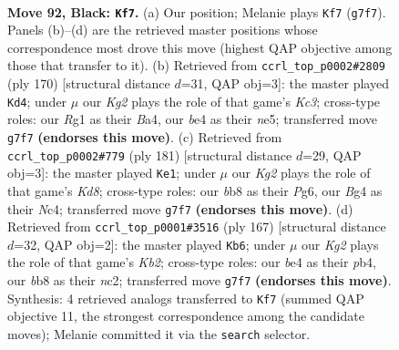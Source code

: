\documentclass[11pt]{article}
\begin{document}
\clearpage

\begin{figure}[p]\centering
\begin{subfigure}{0.46\textwidth}\centering
\resizebox{\linewidth}{!}{%
\newchessgame
\chessboard[
  setfen={1B6/6k1/1PR5/3N4/P3B1b1/1K5p/8/6r1 b - - 6 92},
  showmover=false,
  pgfstyle=straightmove, color=movearrow, markmove={g7-f7}
]}
\caption{}
\end{subfigure}\hfill
\begin{subfigure}{0.46\textwidth}\centering
\resizebox{\linewidth}{!}{%
\newchessgame
\chessboard[
  setfen={2R5/4k3/4p1b1/2P1n1p1/B7/2K5/8/8 w - - 7 86},
  showmover=false,
  pgfstyle=straightmove, color=movearrow, markmove={c3-d4}
]}
\caption{}
\end{subfigure}
\\[4pt]
\begin{subfigure}{0.46\textwidth}\centering
\resizebox{\linewidth}{!}{%
\newchessgame
\chessboard[
  setfen={8/3r3p/6p1/8/2n2B2/7P/R5PK/3k4 b - - 55 91},
  showmover=false,
  pgfstyle=straightmove, color=movearrow, markmove={d1-e1}
]}
\caption{}
\end{subfigure}\hfill
\begin{subfigure}{0.46\textwidth}\centering
\resizebox{\linewidth}{!}{%
\newchessgame
\chessboard[
  setfen={8/1k6/8/1p4r1/1P6/2P4R/1KN5/6b1 b - - 78 84},
  showmover=false,
  pgfstyle=straightmove, color=movearrow, markmove={b7-b6}
]}
\caption{}
\end{subfigure}
\caption{\textbf{Move 92, Black: \texttt{Kf7}.} (a) Our position; Melanie plays \texttt{Kf7} (\texttt{g7f7}). Panels (b)--(d) are the retrieved master positions whose correspondence most drove this move (highest QAP objective among those that transfer to it). (b) Retrieved from \texttt{ccrl\_top\_p0002\#2809} (ply 170) [structural distance $d$=31, QAP obj=3]: the master played \texttt{Kd4}; under $\mu$ our \emph{Kg2} plays the role of that game's \emph{Kc3}; cross-type roles: our \emph{R}g1 as their \emph{B}a4, our \emph{b}e4 as their \emph{n}e5; transferred move \texttt{g7f7} \textbf{(endorses this move)}. (c) Retrieved from \texttt{ccrl\_top\_p0002\#779} (ply 181) [structural distance $d$=29, QAP obj=3]: the master played \texttt{Ke1}; under $\mu$ our \emph{Kg2} plays the role of that game's \emph{Kd8}; cross-type roles: our \emph{b}b8 as their \emph{P}g6, our \emph{B}g4 as their \emph{N}c4; transferred move \texttt{g7f7} \textbf{(endorses this move)}. (d) Retrieved from \texttt{ccrl\_top\_p0001\#3516} (ply 167) [structural distance $d$=32, QAP obj=2]: the master played \texttt{Kb6}; under $\mu$ our \emph{Kg2} plays the role of that game's \emph{Kb2}; cross-type roles: our \emph{b}e4 as their \emph{p}b4, our \emph{b}b8 as their \emph{n}c2; transferred move \texttt{g7f7} \textbf{(endorses this move)}. Synthesis: 4 retrieved analogs transferred to \texttt{Kf7} (summed QAP objective 11, the strongest correspondence among the candidate moves); Melanie committed it via the \texttt{search} selector.}
\label{fig:thought-m183}
\end{figure}
\end{document}
